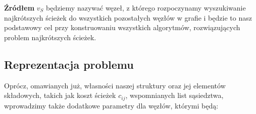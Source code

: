 \begin{myitemize}
\item \textbf{Źródłem} $v_{S}$ będziemy nazywać węzeł, z którego rozpoczynamy wyszukiwanie najkrótszych ścieżek do wszystkich pozostałych węzłów w grafie i będzie to nasz podstawowy cel przy konstruowaniu wszystkich algorytmów, rozwiązujących problem najkrótszych ścieżek.

\end{myitemize}

\subsection{Reprezentacja problemu}
\label{sub:problemRepresentation}

Oprócz, omawianych już, własności naszej struktury oraz jej elementów składowych, takich jak koszt ścieżek $c_{ij}$, wspomnianych list sąsiedztwa, wprowadzimy także dodatkowe parametry dla węzłów, którymi będą:

